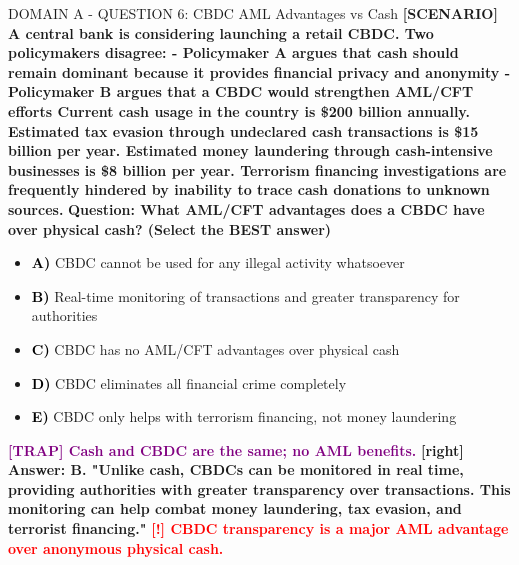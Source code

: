 \documentclass[11pt,a4paper]{beamer}
\newcommand{\redflag}[1]{\textcolor{red}{\textbf{[!] #1}}}
\newcommand{\trap}[1]{\textcolor{purple}{\textbf{[TRAP] #1}}}
\newcommand{\correct}[1]{\textcolor{green!50!black}{\textbf{[right] #1}}}
\newcommand{\scenario}[1]{\textcolor{blue!70!black}{\textbf{[SCENARIO] #1}}}
\newcommand{\option}[1]{\textcolor{black}{\textbf{#1}}}
\begin{document}
\begin{frame}{DOMAIN A - QUESTION 6: CBDC AML Advantages vs Cash}
\scenario{A central bank is considering launching a retail CBDC. Two policymakers disagree:
- Policymaker A argues that cash should remain dominant because it provides financial privacy and anonymity
- Policymaker B argues that a CBDC would strengthen AML/CFT efforts
Current cash usage in the country is \$200 billion annually. Estimated tax evasion through undeclared cash transactions is \$15 billion per year. Estimated money laundering through cash-intensive businesses is \$8 billion per year. Terrorism financing investigations are frequently hindered by inability to trace cash donations to unknown sources.}
\vspace{0.2cm}
\textbf{Question: What AML/CFT advantages does a CBDC have over physical cash? (Select the BEST answer)}
\vspace{0.1cm}
\begin{itemize}
    \item \option{A)} CBDC cannot be used for any illegal activity whatsoever
    \item \option{B)} Real-time monitoring of transactions and greater transparency for authorities
    \item \option{C)} CBDC has no AML/CFT advantages over physical cash
    \item \option{D)} CBDC eliminates all financial crime completely
    \item \option{E)} CBDC only helps with terrorism financing, not money laundering
\end{itemize}
\vspace{0.2cm}
\trap{Cash and CBDC are the same; no AML benefits.}
\correct{Answer: B. "Unlike cash, CBDCs can be monitored in real time, providing authorities with greater transparency over transactions. This monitoring can help combat money laundering, tax evasion, and terrorist financing."}
\redflag{CBDC transparency is a major AML advantage over anonymous physical cash.}
\end{frame}
\end{document}
